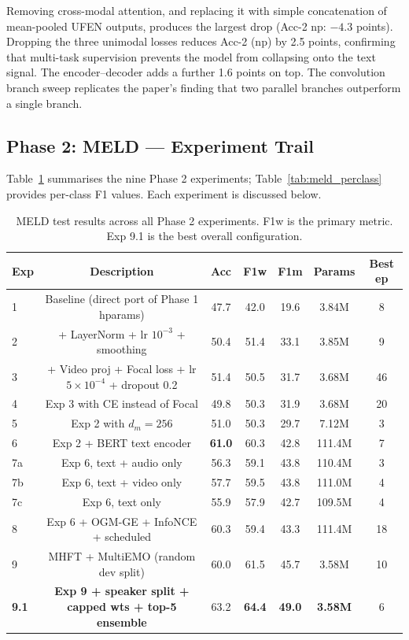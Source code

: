 \documentclass[11pt,twocolumn]{article}
\begin{document}
Removing cross-modal attention, and replacing it with simple concatenation of mean-pooled UFEN outputs, produces the largest drop (Acc-2 np: $-4.3$ points). Dropping the three unimodal losses reduces Acc-2 (np) by 2.5 points, confirming that multi-task supervision prevents the model from collapsing onto the text signal. The encoder--decoder adds a further 1.6 points on top. The convolution branch sweep replicates the paper's finding that two parallel branches outperform a single branch.

\subsection{Phase 2: MELD --- Experiment Trail}

Table~\ref{tab:meld_summary} summarises the nine Phase 2 experiments; Table~\ref{tab:meld_perclass} provides per-class F1 values. Each experiment is discussed below.

\begin{table}[t]
\centering
\small
\begin{tabular}{lcccccc}
\toprule
\textbf{Exp} & \textbf{Description} & \textbf{Acc} & \textbf{F1w} & \textbf{F1m} & \textbf{Params} & \textbf{Best ep} \\
\midrule
1    & Baseline (direct port of Phase 1 hparams)  & 47.7 & 42.0 & 19.6 & 3.84M & 8 \\
2    & + LayerNorm + lr $10^{-3}$ + smoothing     & 50.4 & 51.4 & 33.1 & 3.85M & 9 \\
3    & + Video proj + Focal loss + lr $5\!\!\times\!\!10^{-4}$ + dropout 0.2 & 51.4 & 50.5 & 31.7 & 3.68M & 46 \\
4    & Exp 3 with CE instead of Focal             & 49.8 & 50.3 & 31.9 & 3.68M & 20 \\
5    & Exp 2 with $d_m = 256$                     & 51.0 & 50.3 & 29.7 & 7.12M & 3 \\
6    & Exp 2 + BERT text encoder                  & \textbf{61.0} & 60.3 & 42.8 & 111.4M & 7 \\
7a   & Exp 6, text + audio only                   & 56.3 & 59.1 & 43.8 & 110.4M & 3 \\
7b   & Exp 6, text + video only                   & 57.7 & 59.5 & 43.8 & 111.0M & 4 \\
7c   & Exp 6, text only                           & 55.9 & 57.9 & 42.7 & 109.5M & 4 \\
8    & Exp 6 + OGM-GE + InfoNCE + scheduled       & 60.3 & 59.4 & 43.3 & 111.4M & 18 \\
9    & MHFT + MultiEMO (random dev split)         & 60.0 & 61.5 & 45.7 & 3.58M & 10 \\
\textbf{9.1} & \textbf{Exp 9 + speaker split + capped wts + top-5 ensemble} & 63.2 & \textbf{64.4} & \textbf{49.0} & \textbf{3.58M} & 6 \\
\bottomrule
\end{tabular}
\caption{MELD test results across all Phase 2 experiments. F1w is the primary metric. Exp 9.1 is the best overall configuration.}
\label{tab:meld_summary}
\end{table}
\end{document}
